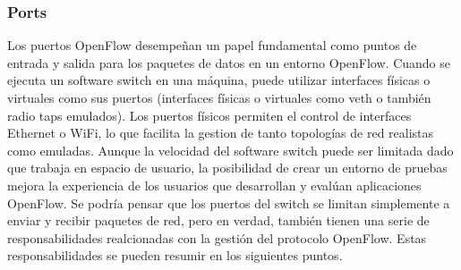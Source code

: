 \subsubsection{Ports}

Los puertos OpenFlow desempeñan un papel fundamental como puntos de entrada y salida para los paquetes de datos en un entorno OpenFlow. Cuando se ejecuta un software switch en una máquina, puede utilizar interfaces físicas o virtuales como sus puertos (interfaces físicas o virtuales como \gls{veth} o también radio taps emulados). Los puertos físicos permiten el control de interfaces Ethernet o WiFi, lo que facilita la gestion de tanto topologías de red realistas como emuladas. Aunque la velocidad del software switch puede ser limitada dado que trabaja en espacio de usuario, la posibilidad de crear un entorno de pruebas mejora la experiencia de los usuarios que desarrollan y evalúan aplicaciones OpenFlow. Se podría pensar que los puertos del switch se limitan simplemente a enviar y recibir paquetes de red, pero en verdad, también tienen una serie de responsabilidades realcionadas con la gestión del protocolo OpenFlow. Estas responsabilidades se pueden resumir en los siguientes puntos.


